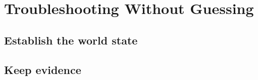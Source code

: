 \chapter{Troubleshooting Without Guessing}
\label{chap:troubleshooting}

\section{Establish the world state}

\section{Keep evidence}

